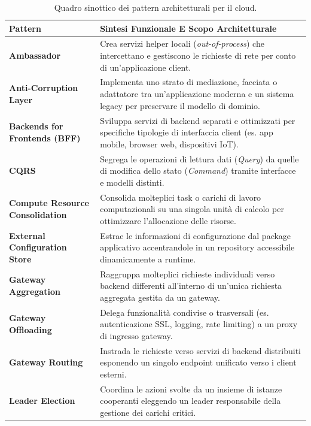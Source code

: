 \documentclass[11pt, a4paper]{article}
\begin{document}
\begin{table}[H]
\centering
\small
\caption{Quadro sinottico dei pattern architetturali per il cloud.}
\label{tab:cloud_patterns_summary}
\begin{tabularx}{\textwidth}{l X}
\toprule
\textbf{Pattern} & \textbf{Sintesi Funzionale E Scopo Architetturale} \\
\midrule
\textbf{Ambassador} &
Crea servizi helper locali (\emph{out-of-process}) che intercettano e gestiscono le richieste di rete per conto di un'applicazione client. \\
\addlinespace
\textbf{Anti-Corruption Layer} &
Implementa uno strato di mediazione, facciata o adattatore tra un'applicazione moderna e un sistema legacy per preservare il modello di dominio. \\
\addlinespace
\textbf{Backends for Frontends (BFF)} &
Sviluppa servizi di backend separati e ottimizzati per specifiche tipologie di interfaccia client (es. app mobile, browser web, dispositivi IoT). \\
\addlinespace
\textbf{CQRS} &
Segrega le operazioni di lettura dati (\emph{Query}) da quelle di modifica dello stato (\emph{Command}) tramite interfacce e modelli distinti. \\
\addlinespace
\textbf{Compute Resource Consolidation} &
Consolida molteplici task o carichi di lavoro computazionali su una singola unità di calcolo per ottimizzare l'allocazione delle risorse. \\
\addlinespace
\textbf{External Configuration Store} &
Estrae le informazioni di configurazione dal package applicativo accentrandole in un repository accessibile dinamicamente a runtime. \\
\addlinespace
\textbf{Gateway Aggregation} &
Raggruppa molteplici richieste individuali verso backend differenti all'interno di un'unica richiesta aggregata gestita da un gateway. \\
\addlinespace
\textbf{Gateway Offloading} &
Delega funzionalità condivise o trasversali (es. autenticazione SSL, logging, rate limiting) a un proxy di ingresso gateway. \\
\addlinespace
\textbf{Gateway Routing} &
Instrada le richieste verso servizi di backend distribuiti esponendo un singolo endpoint unificato verso i client esterni. \\
\addlinespace
\textbf{Leader Election} &
Coordina le azioni svolte da un insieme di istanze cooperanti eleggendo un leader responsabile della gestione dei carichi critici. \\

\end{tabularx}
\end{table}
\end{document}
